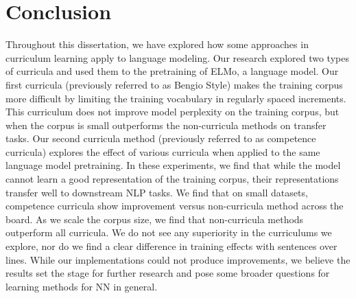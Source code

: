 \chapter{Conclusion}
\label{chap:conclusion}
Throughout this dissertation, we have explored how some approaches in curriculum learning apply to language modeling. Our research explored two types of curricula and used them to the pretraining of ELMo, a language model. Our first curricula (previously referred to as Bengio Style) makes the training corpus more difficult by limiting the training vocabulary in regularly spaced increments. This curriculum does not improve model perplexity on the training corpus, but when the corpus is small outperforms the non-curricula methods on transfer tasks. Our second curricula method (previously referred to as competence curricula) explores the effect of various curricula when applied to the same language model pretraining. In these experiments, we find that while the model cannot learn a good representation of the training corpus, their representations transfer well to downstream NLP tasks. We find that on small datasets, competence curricula show improvement versus non-curricula method across the board. As we scale the corpus size, we find that non-curricula methods outperform all curricula. We do not see any superiority in the curriculums we explore, nor do we find a clear difference in training effects with sentences over lines. While our implementations could not produce improvements, we believe the results set the stage for further research and pose some broader questions for learning methods for NN in general. 